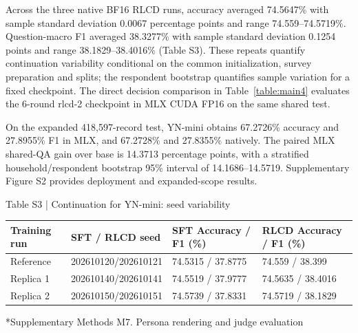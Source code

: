 \documentclass[10pt]{article}
\makeatletter
\renewcommand\section{\@startsection{section}{1}{\z@}{-2.2ex plus -1ex minus -.2ex}{.9ex plus .2ex}{\normalfont\large\mdseries}}
\makeatother
\begin{document}
Across the three native BF16 RLCD runs, accuracy averaged 74.5647\% with sample standard deviation 0.0067 percentage points and range 74.559–74.5719\%. Question-macro F1 averaged 38.3277\% with sample standard deviation 0.1254 points and range 38.1829–38.4016\% (Table S3). These repeats quantify continuation variability conditional on the common initialization, survey preparation and splits; the respondent bootstrap quantifies sample variation for a fixed checkpoint. The direct decision comparison in Table~\ref{table:main4} evaluates the 6-round rlcd-2 checkpoint in MLX CUDA FP16 on the same shared test.

On the expanded 418,597-record test, YN-mini obtains 67.2726\% accuracy and 27.8955\% F1 in MLX, and 67.2728\% and 27.8355\% natively. The paired MLX shared-QA gain over base is 14.3713 percentage points, with a stratified household/respondent bootstrap 95\% interval of 14.1686–14.5719. Supplementary Figure S2 provides deployment and expanded-scope results.

\begin{center}
\begin{minipage}{\textwidth}
\fontsize{8.5}{10.3}\selectfont
Table S3 | Continuation for YN-mini: seed variability
\par\vspace{4pt}
\begin{tabularx}{\textwidth}{@{}XXXX@{}}
\toprule
Training run & SFT / RLCD seed & SFT Accuracy / F1 (\%) & RLCD Accuracy / F1 (\%) \\
\midrule
Reference & 202610120/202610121 & 74.5315 / 37.8775 & 74.559 / 38.399 \\
Replica 1 & 202610140/202610141 & 74.5519 / 37.9777 & 74.5635 / 38.4016 \\
Replica 2 & 202610150/202610151 & 74.5739 / 37.8331 & 74.5719 / 38.1829 \\
\bottomrule
\end{tabularx}
\par{}
\end{minipage}
\end{center}

\section*{Supplementary Methods M7. Persona rendering and judge evaluation}
\end{document}
